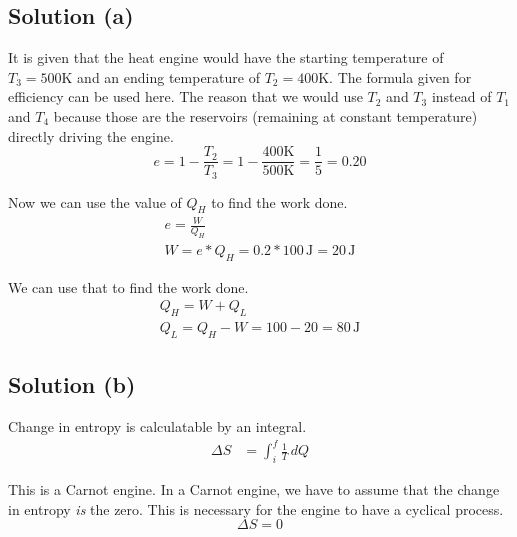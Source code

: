 \documentclass[12pt]{article}
\begin{document}
        \subsection{Solution (a)}
            It is given that the heat engine would have the starting temperature of $T_3 = 500\unit{\kelvin}$ and an ending temperature of $T_2 = 400\unit{\kelvin}$. 
            The formula given for efficiency can be used here. 
            The reason that we would use $T_2$ and $T_3$ instead of $T_1$ and $T_4$ because those are the reservoirs (remaining at constant temperature) directly driving the engine. 
            \begin{equation}
                e   =   1 - \frac{T_2}{T_3}
                    =   1 - \frac{400\unit{\kelvin}}{500\unit{\kelvin}}
                    =   \frac{1}{5}
                    =   0.20
            \end{equation}

            Now we can use the value of $Q_H$ to find the work done. 
            \begin{gather}
                e   =   \frac{W}{Q_H}\\
                W   =   e * Q_H
                    =   0.2 * 100\,\unit{\joule}
                    =   \boxed{20\,\unit{\joule}}
            \end{gather}

            We can use that to find the work done. 
            \begin{gather}
                Q_H =   W + Q_L\\
                Q_L =   Q_H - W
                    =   100 - 20
                    =   \boxed{80\,\unit{\joule}}
            \end{gather}

        \subsection{Solution (b)}
            Change in entropy is calculatable by an integral.
            \begin{align}
                \Delta S    &=  \int_{i}^{f}\frac{1}{T}\,dQ
            \end{align}

            This is a Carnot engine.
            In a Carnot engine, we have to assume that the change in entropy \textit{is} the zero. 
            This is necessary for the engine to have a cyclical process. 
            \begin{equation}
                \boxed{\Delta S = 0}
            \end{equation}
\end{document}
